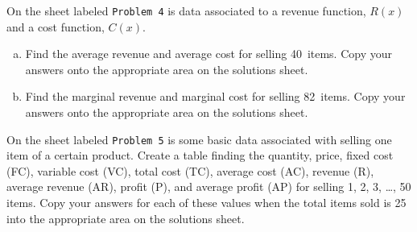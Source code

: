 \documentclass[11pt,letterpaper]{article}
\begin{document}
 On the sheet labeled \texttt{Problem 4} is data associated to a revenue function, $R(x)$ and a cost function, $C(x)$. 
	\begin{enumerate}[(a)]
	\item Find the average revenue and average cost for selling 40~items. Copy your answers onto the appropriate area on the solutions sheet.
	\item Find the marginal revenue and marginal cost for selling 82~items. Copy your answers onto the appropriate area on the solutions sheet.
	\end{enumerate}


 On the sheet labeled \texttt{Problem 5} is some basic data associated with selling one item of a certain product. Create a table finding the quantity, price, fixed cost (FC), variable cost (VC), total cost (TC), average cost (AC), revenue (R), average revenue (AR), profit (P), and average profit (AP) for selling 1, 2, 3, \ldots, 50 items. Copy your answers for each of these values when the total items sold is 25 into the appropriate area on the solutions sheet.
\end{document}
